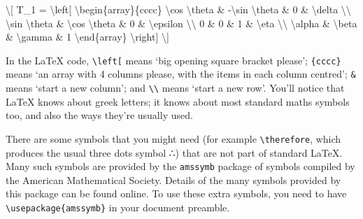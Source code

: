 \documentclass[
]{book}
\newenvironment{Shaded}{\begin{snugshade}}{\end{snugshade}}
\newcommand{\SpecialCharTok}[1]{\textcolor[rgb]{0.00,0.00,0.00}{#1}}
\newcommand{\SpecialStringTok}[1]{\textcolor[rgb]{0.31,0.60,0.02}{#1}}
\begin{document}
\begin{Shaded}
\begin{Highlighting}[]
   \SpecialStringTok{\textbackslash{}[ T\_1 = }\SpecialCharTok{\textbackslash{}left}\SpecialStringTok{[}
\SpecialStringTok{    }\SpecialCharTok{\textbackslash{}begin}\SpecialStringTok{\{array\}\{cccc\}}
\SpecialStringTok{    }\SpecialCharTok{\textbackslash{}cos}\SpecialStringTok{ }\SpecialCharTok{\textbackslash{}theta}\SpecialStringTok{ \& {-}}\SpecialCharTok{\textbackslash{}sin}\SpecialStringTok{ }\SpecialCharTok{\textbackslash{}theta}\SpecialStringTok{ \& 0 \& }\SpecialCharTok{\textbackslash{}delta}\SpecialStringTok{ }\SpecialCharTok{\textbackslash{}\textbackslash{}}
\SpecialStringTok{    }\SpecialCharTok{\textbackslash{}sin}\SpecialStringTok{ }\SpecialCharTok{\textbackslash{}theta}\SpecialStringTok{  \& }\SpecialCharTok{\textbackslash{}cos}\SpecialStringTok{ }\SpecialCharTok{\textbackslash{}theta}\SpecialStringTok{ \& 0 \& }\SpecialCharTok{\textbackslash{}epsilon}\SpecialStringTok{ }\SpecialCharTok{\textbackslash{}\textbackslash{}}
\SpecialStringTok{    0 \& 0 \& 1 \& }\SpecialCharTok{\textbackslash{}eta}\SpecialStringTok{ }\SpecialCharTok{\textbackslash{}\textbackslash{}}
\SpecialStringTok{    }\SpecialCharTok{\textbackslash{}alpha}\SpecialStringTok{ \& }\SpecialCharTok{\textbackslash{}beta}\SpecialStringTok{ \& }\SpecialCharTok{\textbackslash{}gamma}\SpecialStringTok{ \& 1}
\SpecialStringTok{    }\SpecialCharTok{\textbackslash{}end}\SpecialStringTok{\{array\}}
\SpecialStringTok{    }\SpecialCharTok{\textbackslash{}right}\SpecialStringTok{] \textbackslash{}]}
\end{Highlighting}
\end{Shaded}

In the LaTeX code, \texttt{\textbackslash{}left{[}} means `big opening square bracket please'; \texttt{\{cccc\}} means `an array with 4 columns please, with the items in each column centred'; \texttt{\&} means `start a new column'; and \texttt{\textbackslash{}\textbackslash{}} means `start a new row'. You'll notice that LaTeX knows about greek letters; it knows about most standard maths symbols too, and also the ways they're usually used.

There are some symbols that you might need (for example \texttt{\textbackslash{}therefore}, which produces the usual three dots symbol ∴) that are not part of standard LaTeX. Many such symbols are provided by the \texttt{amssymb} package of symbols compiled by the American Mathematical Society. Details of the many symbols provided by this package can be found online. To use these extra symbols, you need to have \texttt{\textbackslash{}usepackage\{amssymb\}} in your document preamble.
\end{document}
